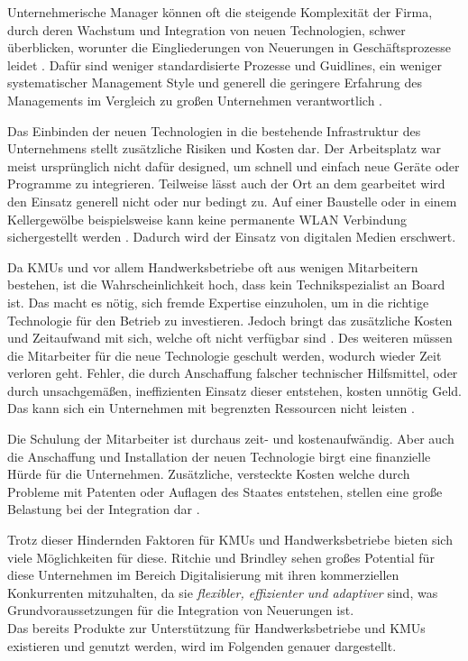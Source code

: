Unternehmerische Manager können oft die steigende Komplexität der Firma, durch deren Wachstum und Integration von neuen Technologien, schwer überblicken, worunter die Eingliederungen von Neuerungen in Geschäftsprozesse leidet \cite{rothwell_small_1989}. Dafür sind weniger standardisierte Prozesse und Guidlines, ein weniger systematischer Management Style und generell die geringere Erfahrung des Managements im Vergleich zu großen Unternehmen verantwortlich \cite{allocca_innovation_2006}. 

Das Einbinden der neuen Technologien in die bestehende Infrastruktur des Unternehmens stellt zusätzliche Risiken und Kosten dar. Der Arbeitsplatz war meist ursprünglich nicht dafür designed, um schnell und einfach neue Geräte oder Programme zu integrieren. Teilweise lässt auch der Ort an dem gearbeitet wird den Einsatz generell nicht oder nur bedingt zu. Auf einer Baustelle oder in einem Kellergewölbe beispielsweise kann keine permanente WLAN Verbindung sichergestellt werden \cite{TODO: Buchkapitel}. Dadurch wird der Einsatz von digitalen Medien erschwert.

Da KMUs und vor allem Handwerksbetriebe oft aus wenigen Mitarbeitern bestehen, ist die Wahrscheinlichkeit hoch, dass kein Technikspezialist an Board ist. Das macht es nötig, sich fremde Expertise einzuholen, um in die richtige Technologie für den Betrieb zu investieren. Jedoch bringt das zusätzliche Kosten und Zeitaufwand mit sich, welche oft nicht verfügbar sind \cite{rothwell_small_1989}. Des weiteren müssen die Mitarbeiter für die neue Technologie geschult werden, wodurch wieder Zeit verloren geht. Fehler, die durch Anschaffung falscher technischer Hilfsmittel, oder durch unsachgemäßen, ineffizienten Einsatz dieser entstehen, kosten unnötig Geld. Das kann sich ein Unternehmen mit begrenzten Ressourcen nicht leisten \cite{allocca_innovation_2006}.

Die Schulung der Mitarbeiter ist durchaus zeit- und kostenaufwändig. Aber auch die Anschaffung und Installation der neuen Technologie birgt eine finanzielle Hürde für die Unternehmen. Zusätzliche, versteckte Kosten welche durch Probleme mit Patenten oder Auflagen des Staates entstehen, stellen eine große Belastung bei der Integration dar \cite{rothwell_small_1989}. 

Trotz dieser Hindernden Faktoren für KMUs und Handwerksbetriebe bieten sich viele Möglichkeiten für diese. Ritchie und Brindley \cite{ritchie_ict_2005} sehen großes Potential für diese Unternehmen im Bereich Digitalisierung mit ihren kommerziellen Konkurrenten mitzuhalten, da sie \textit{flexibler, effizienter und adaptiver} sind, was Grundvoraussetzungen für die Integration von Neuerungen ist. \\
Das bereits Produkte zur Unterstützung für Handwerksbetriebe und KMUs existieren und genutzt werden, wird im Folgenden genauer dargestellt.

